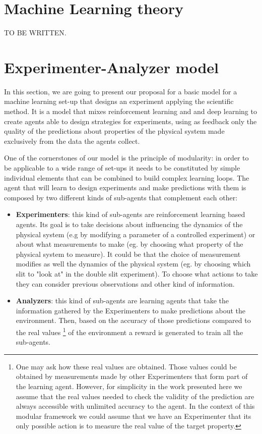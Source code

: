 \documentclass[11pt,a4paper,twoside]{report}
\newcommand{\+}{\textnormal{+} }
\theoremstyle{definition}
\numberwithin{equation}{chapter}
\begin{document}
\chapter{Machine Learning theory} 

TO BE WRITTEN.

\chapter{Experimenter-Analyzer model} \label{EAmodel}

In this section, we are going to present our proposal for a basic model for a
machine learning set-up that designs an experiment applying the scientific
method. It is a model that mixes reinforcement learning and and deep learning to
create agents able to design strategies for experiments, using as feedback only
the quality of the predictions about properties of the physical system made
exclusively from the data the agents collect. 

One of the cornerstones of our model is the principle of modularity: in order to
be applicable to a wide range of set-ups it needs to be constituted by simple
individual elements that can be combined to build complex learning loops. The
agent that will learn to design experiments and make predictions with them is
composed by two different kinds of sub-agents that complement each other:

\begin{itemize}
  \item \textbf{Experimenters}: this kind of sub-agents are reinforcement
  learning based agents. Its goal is to take decisions about influencing the
  dynamics of the physical system (e.g by modifying a parameter of a controlled
  experiment) or about what measurements to make (eg. by choosing what property
  of the physical system to measure). It could be that the choice of
  measurement modifies as well the dynamics of the physical system (eg. by
  choosing which slit to "look at" in the double slit experiment). To choose
  what actions to take they can consider previous observations and other kind of 
  information.
  \item \textbf{Analyzers}: this kind of sub-agents are learning agents
  that take the information gathered by the Experimenters to make predictions
  about the environment. Then, based on the accuracy of those predictions
  compared to the real values \footnote{One may ask how these real values are
  obtained. Those values could be obtained by measurements made by other
  Experimenters that form part of the learning agent. However, for simplicity in
  the work presented here we assume that the real values needed to check the
  validity of the prediction are always accessible with unlimited accuracy to
  the agent. In the context of this modular framework we could assume that we
  have an Experimenter that its only possible action is to measure the real
  value of the target property.} of the environment a reward is generated to
  train all the sub-agents. 

\end{itemize}
\end{document}

